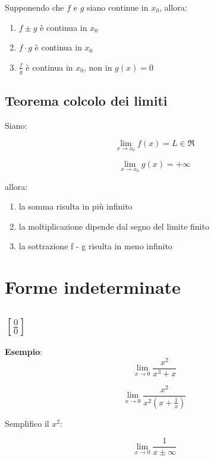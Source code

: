 Supponendo che $f$ e $g$ siano continue in $x_0$, allora:
\begin{enumerate}
    \item $f \pm g$ è continua in $x_0$
    \item $f \cdot g$ è continua in $x_0$
    \item $\frac{f}{g}$ è continua in $x_0$, non in $g(x) =0$
\end{enumerate}

\subsection{Teorema colcolo dei limiti}

Siano:

\begin{equation*}
    \lim_{x \rightarrow x_0} f(x) = L \in \Re
\end{equation*}

\begin{equation*}
    \lim_{x \rightarrow x_0} g(x) = +\infty
\end{equation*}

allora:

\begin{enumerate}
    \item la somma risulta in più infinito
    \item la moltiplicazione dipende dal segno del limite finito
    \item la sottrazione f - g risulta in meno infinito 
\end{enumerate}

\section{Forme indeterminate}
\subsection{$[\frac{0}{0}]$}
\textbf{Esempio}:
\begin{equation*}
    \lim_{x \rightarrow 0} \frac{x^2}{x^3 + x}
\end{equation*} 

\begin{equation*}
    \lim_{x \rightarrow 0} \frac{x^2}{x^2(x + \frac{1}{x})}
\end{equation*}

Semplifico il $x^2$:

\begin{equation*}
    \lim_{x \rightarrow 0} \frac{1}{x \pm\infty}
\end{equation*}

